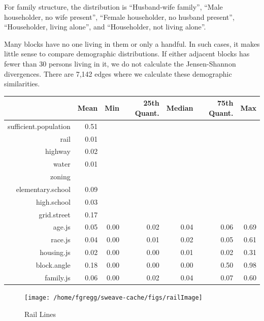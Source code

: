 \documentclass[12pt,letter]{article}\usepackage[]{graphicx}\usepackage[]{color}
\makeatletter
\newenvironment{kframe}{%
 \def\at@end@of@kframe{}%
 \ifinner\ifhmode%
  \def\at@end@of@kframe{\end{minipage}}%
  \begin{minipage}{\columnwidth}%
 \fi\fi%
 \def\FrameCommand##1{\hskip\@totalleftmargin \hskip-\fboxsep
 \colorbox{shadecolor}{##1}\hskip-\fboxsep
     \hskip-\linewidth \hskip-\@totalleftmargin \hskip\columnwidth}%
 \MakeFramed {\advance\hsize-\width
   \@totalleftmargin\z@ \linewidth\hsize
   \@setminipage}}%
 {\par\unskip\endMakeFramed%
 \at@end@of@kframe}
\newenvironment{knitrout}{}{} %
\makeatother
\begin{document}
For family structure, the distribution is ``Husband-wife family'', ``Male
householder, no wife present'', ``Female householder, no husband present'',
``Householder, living alone'', and ``Householder, not living alone''.

Many blocks have no one living in them or only a handful. In such
cases, it makes little sense to compare demographic distributions. If
either adjacent blocks has fewer than 30 persons living in it, we do
not calculate the Jensen-Shannon divergences. There are
7,142 edges where we calculate these
demographic similarities.


\begin{kframe}


{\ttfamily\noindent\color{warningcolor}{\#\# Warning: argument is not numeric or logical: returning NA}}\end{kframe}%
\begin{table}[ht]
\centering
\begin{tabular}{rrrrrrr}
  \hline
 & Mean & Min & 25th Quant. & Median & 75th Quant. & Max \\ 
  \hline
sufficient.population & 0.51 &  &  &  &  &  \\ 
  rail & 0.01 &  &  &  &  &  \\ 
  highway & 0.02 &  &  &  &  &  \\ 
  water & 0.01 &  &  &  &  &  \\ 
  zoning &  &  &  &  &  &  \\ 
  elementary.school & 0.09 &  &  &  &  &  \\ 
  high.school & 0.03 &  &  &  &  &  \\ 
  grid.street & 0.17 &  &  &  &  &  \\ 
  age.js & 0.05 & 0.00 & 0.02 & 0.04 & 0.06 & 0.69 \\ 
  race.js & 0.04 & 0.00 & 0.01 & 0.02 & 0.05 & 0.61 \\ 
  housing.js & 0.02 & 0.00 & 0.00 & 0.01 & 0.02 & 0.31 \\ 
  block.angle & 0.18 & 0.00 & 0.00 & 0.00 & 0.50 & 0.98 \\ 
  family.js & 0.06 & 0.00 & 0.02 & 0.04 & 0.07 & 0.60 \\ 
   \hline
\end{tabular}
\end{table}



\begin{figure}
\begin{knitrout}
\color{fgcolor}

{\centering \texttt{[image: /home/fgregg/sweave-cache/figs/railImage]} 

}



\end{knitrout}

\caption{Rail Lines}
\end{figure}
\end{document}
